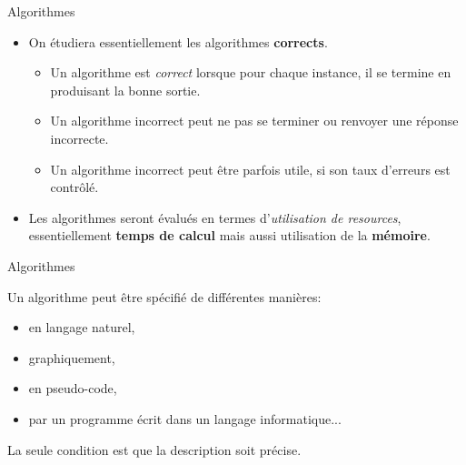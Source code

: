 \begin{frame}{Algorithmes}
\begin{itemize}
\item On étudiera essentiellement les algorithmes {\bf corrects}.
\begin{itemize}
\item Un algorithme est {\em correct} lorsque pour chaque instance, il se termine en produisant la bonne sortie.
\item Un algorithme incorrect peut ne pas se terminer ou renvoyer une réponse incorrecte.
\item Un algorithme incorrect peut être parfois utile, si son taux d'erreurs est contrôlé.
\end{itemize}
\bigskip
\item Les algorithmes seront évalués en termes d'{\em utilisation de resources}, essentiellement {\bf temps de calcul} mais aussi utilisation de la {\bf mémoire}.
\end{itemize}
\end{frame}

\begin{frame}{Algorithmes}

Un algorithme peut être spécifié de différentes manières:
\begin{itemize}
\item en langage naturel,
\item graphiquement,
\item en pseudo-code,
\item par un programme écrit dans un langage informatique...
\end{itemize}
La seule condition est que la description soit précise.



\end{frame}

